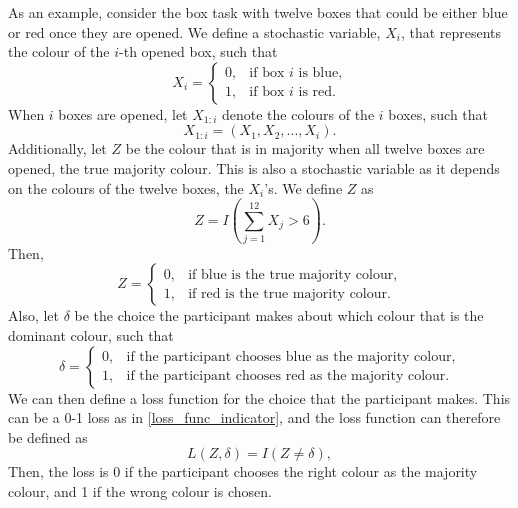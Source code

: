 As an example, consider the box task with twelve boxes that could be either blue or red once they are opened. We define a stochastic variable, $X_i$, that represents the colour of the $i$-th opened box, such that 
\begin{equation}
\label{def_of_Xi}
    X_i =
    \begin{cases}
        0,& \text{if box }i \text{ is blue,}\\
        1,& \text{if box }i \text{ is red.}
    \end{cases}
\end{equation}
When $i$ boxes are opened, let $X_{1:i}$ denote the colours of the $i$ boxes, such that
\begin{equation}
\label{def_of_X1:i}
    X_{1:i} = (X_1,X_2,...,X_{i}).
\end{equation}
Additionally, let $Z$ be the colour that is in majority when all twelve boxes are opened, the true majority colour. This is also a stochastic variable as it depends on the colours of the twelve boxes, the $X_i$'s. We define $Z$ as
\begin{equation}
\label{def_of_Z}
    Z = I\left(\sum_{j=1}^{12}X_j > 6\right).
\end{equation}
Then,
\begin{equation}
\label{Z_true_majority}
    Z = 
    \begin{cases}
        0,& \text{if blue is the true majority colour,} \\
        1,& \text{if red is the true majority colour.}
    \end{cases}
\end{equation}
Also, let $\delta$ be the choice the participant makes about which colour that is the dominant colour, such that
\begin{equation*}
    \delta = 
    \begin{cases}
        0,& \text{if the participant chooses blue as the majority colour,}\\
        1,& \text{if the participant chooses red as the majority colour}.
    \end{cases}
\end{equation*}
We can then define a loss function for the choice that the participant makes. This can be a 0-1 loss as in \eqref{loss_func_indicator}, and the loss function can therefore be defined as 
\begin{equation}
\label{loss_func_example}
    L(Z,\delta) = I(Z \neq \delta),
\end{equation}
Then, the loss is 0 if the participant chooses the right colour as the majority colour, and 1 if the wrong colour is chosen. 

